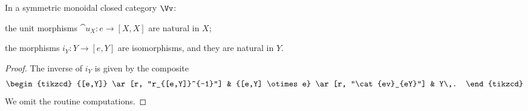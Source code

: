 \begin{prop}
    In a symmetric monoidal closed category $\Vv$:
    \begin{rmnumerate}
        \item the unit morphisms $\cat{u}_{X}:e \to [X,X]$ are natural in $X$;
        \item the morphisms $i_{Y} : Y \to [e,Y]$ are isomorphisms, 
        and they are natural in $Y$.
    \end{rmnumerate}
    \begin{proof}
        The inverse of $i_{Y}$ is given by the composite
        \begin{equation*}
            \begin{tikzcd}
                {[e,Y]} \ar[r, "r_{[e,Y]}^{-1}"]
                & {[e,Y] \otimes e} \ar[r, "\cat{ev}_{eY}"]
                & Y\,.
            \end{tikzcd}
        \end{equation*}
        We omit the routine computations.
    \end{proof}
\end{prop}